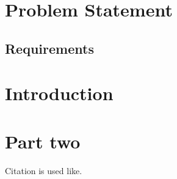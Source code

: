 \documentclass[11pt,english, openany]{book}
\begin{document}
\tableofcontents{}

\mainmatter

\chapter{Problem Statement}\label{chapt:problem}

\lipsum[1-2]

\section{Requirements} 




\chapter{Introduction}\label{chapt:intro}

\lipsum

\chapter{Part two}
Citation is used like\cite{ex}.
\end{document}
